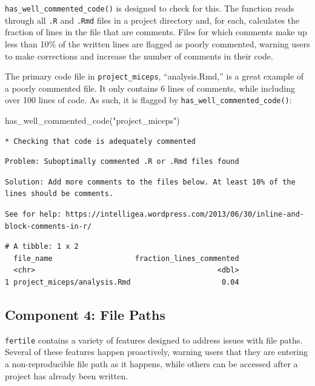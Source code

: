 \documentclass[12pt,twoside]{reedthesis}
\newenvironment{Shaded}{\begin{snugshade}}{\end{snugshade}}
\newcommand{\FunctionTok}[1]{\textcolor[rgb]{0.00,0.00,0.00}{#1}}
\newcommand{\NormalTok}[1]{#1}
\newcommand{\StringTok}[1]{\textcolor[rgb]{0.31,0.60,0.02}{#1}}
\begin{document}
\texttt{has\_well\_commented\_code()} is designed to check for this. The function reads through all \texttt{.R} and \texttt{.Rmd} files in a project directory and, for each, calculates the fraction of lines in the file that are comments. Files for which comments make up less than 10\% of the written lines are flagged as poorly commented, warning users to make corrections and increase the number of comments in their code.

The primary code file in \texttt{project\_miceps}, ``analysis.Rmd,'' is a great example of a poorly commented file. It only contains 6 lines of comments, while including over 100 lines of code. As such, it is flagged by \texttt{has\_well\_commented\_code()}:
\begin{Shaded}
\begin{Highlighting}[]
\FunctionTok{has\_well\_commented\_code}\NormalTok{(}\StringTok{"project\_miceps"}\NormalTok{)}
\end{Highlighting}
\end{Shaded}
\begin{verbatim}
* Checking that code is adequately commented 
\end{verbatim}
\begin{verbatim}
Problem: Suboptimally commented .R or .Rmd files found 
\end{verbatim}
\begin{verbatim}
Solution: Add more comments to the files below. At least 10% of the
lines should be comments. 
\end{verbatim}
\begin{verbatim}
See for help: https://intelligea.wordpress.com/2013/06/30/inline-and-
block-comments-in-r/
\end{verbatim}
\begin{verbatim}
# A tibble: 1 x 2
  file_name                   fraction_lines_commented
  <chr>                                          <dbl>
1 project_miceps/analysis.Rmd                     0.04
\end{verbatim}
\hypertarget{component-4-file-paths}{%
\subsection{Component 4: File Paths}\label{component-4-file-paths}}

\texttt{fertile} contains a variety of features designed to address issues with file paths. Several of these features happen proactively, warning users that they are entering a non-reproducible file path as it happens, while others can be accessed after a project has already been written.
\end{document}

